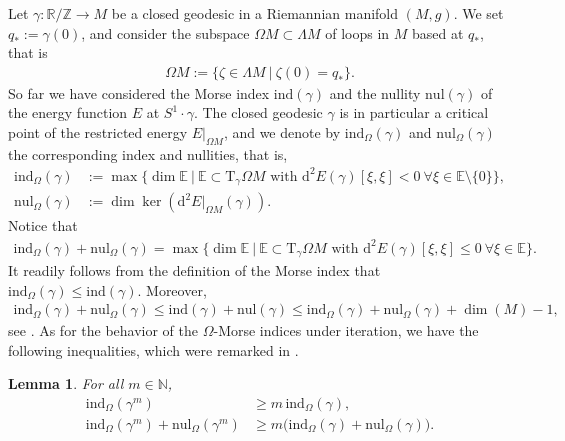 \documentclass[reqno]{amsart}
\numberwithin{equation}{section}
\theoremstyle{personal}%
\newtheorem{lem}[thm]{Lemma}
\theoremstyle{definition}
\newcommand{\N}{\mathds{N}}
\newcommand{\E}{\mathds{E}}
\newcommand{\Z}{\mathds{Z}}
\newcommand{\R}{\mathds{R}}
\newcommand{\diff}{\mathrm{d}}
\newcommand{\Tan}{\mathrm{T}}
\newcommand{\ind}{\mathrm{ind}}
\newcommand{\nul}{\mathrm{nul}}
\begin{document}
Let $\gamma:\R/\Z\to M$ be a closed geodesic in a Riemannian manifold $(M,g)$. We set $q_*:=\gamma(0)$, and consider the subspace $\Omega M\subset\Lambda M$ of loops in $M$ based at $q_*$, that is
\begin{align}\label{e:based_loop_space}
\Omega M:=\big\{ \zeta\in\Lambda M\ |\ \zeta(0)=q_* \big\}.
\end{align}
So far we have considered the Morse index $\ind(\gamma)$ and the nullity $\nul(\gamma)$ of the energy function $E$ at $S^1\cdot\gamma$. 
The closed geodesic $\gamma$ is in particular a critical point of the restricted energy $E|_{\Omega M}$, and we denote by $\ind_\Omega(\gamma)$ and $\nul_\Omega(\gamma)$ the corresponding index and nullities, that is,
\begin{align*}
\ind_\Omega(\gamma) & := \max\big\{ \dim\E\ \big|\ \E\subset\Tan_\gamma\Omega M\mbox{ with }\diff^2 E(\gamma)[\xi,\xi]<0\ \forall\xi\in\E\setminus\{0\}\big\},\\
\nul_\Omega(\gamma) & := \dim\ker(\diff^2 E|_{\Omega M}(\gamma)).
\end{align*}
Notice that
\begin{align*}
 \ind_\Omega(\gamma) +\nul_\Omega(\gamma) = \max\big\{ \dim\E\ \big|\ \E\subset\Tan_\gamma\Omega M\mbox{ with }\diff^2 E(\gamma)[\xi,\xi]\leq 0\ \forall\xi\in\E\big\}.
\end{align*}
It readily follows from the definition of the Morse index that $\ind_{\Omega}(\gamma)\leq\ind(\gamma)$. Moreover, 
\begin{align}\label{e:Ball_Thor_Zill}
\ind_\Omega(\gamma)+\nul_\Omega(\gamma)
\leq
\ind(\gamma)+\nul(\gamma)
\leq
\ind_\Omega(\gamma)+\nul_\Omega(\gamma)+\dim(M)-1,
\end{align}
see \cite[Eq.~(1.7)]{Ballmann:1982rz}. As for the behavior of the $\Omega$-Morse indices under iteration, we have the following inequalities, which were remarked in \cite[pages 256-257]{Hingston:1993ou}.
\begin{lem}\label{l:iteration_Omega_index}
For all $m\in\N$,
\begin{align*}
\ind_\Omega(\gamma^m) & \geq m \, \ind_\Omega(\gamma),\\
 \ind_\Omega(\gamma^m)+\nul_\Omega(\gamma^m) & \geq m \big( \ind_\Omega(\gamma) + \nul_\Omega(\gamma)\big).
\end{align*}
\end{lem}
\end{document}
